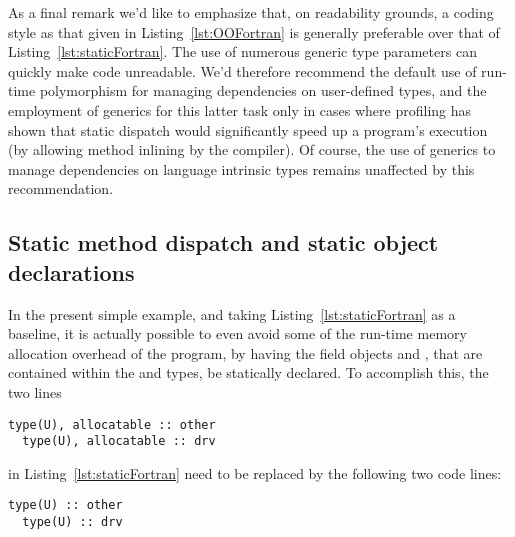 \documentclass[11pt,oneside]{report}
\newcommand{\code}[1]{{\selectfont\ttfamily{#1}}}
\begin{document}
As a final remark we'd like to emphasize that, on readability grounds,
a coding style as that given in Listing~\ref{lst:OOFortran} is
generally preferable over that of
Listing~\ref{lst:staticFortran}. The use of numerous generic type
parameters can quickly make code unreadable. We'd therefore recommend
the default use of run-time polymorphism for managing dependencies on
user-defined types, and the employment of generics for this latter
task only in cases where profiling has shown that static dispatch
would significantly speed up a program's execution (by allowing method
inlining by the compiler). Of course, the use of generics to manage
dependencies on language intrinsic types remains unaffected by this
recommendation.

\subsection{Static method dispatch and static object declarations}

In the present simple example, and taking Listing~\ref{lst:staticFortran}
as a baseline, it is actually possible to even avoid some of the
run-time memory allocation overhead of the program, by having the
field objects \code{other} and \code{drv}, that are contained within
the \code{PairwiseSum} and \code{Averager} types, be statically
declared. To accomplish this, the two lines
\begin{lstlisting}[language=LFortran,style=boxed]
  type(U), allocatable :: other
  type(U), allocatable :: drv
\end{lstlisting}
in Listing~\ref{lst:staticFortran} need to be replaced by the
following two code lines:
\begin{lstlisting}[language=LFortran,style=boxed]
  type(U) :: other
  type(U) :: drv
\end{lstlisting}
\end{document}
